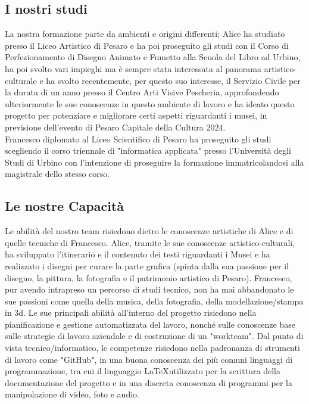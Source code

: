 \documentclass[hidelinks,12pt,a4paper]{article}
\begin{document}
\begin{flushleft}
		\subsection{I nostri studi}
		La nostra formazione parte da ambienti e origini differenti;
		Alice ha studiato presso il Liceo Artistico di Pesaro e ha poi proseguito gli studi con il Corso di Perfezionamento di Disegno Animato e Fumetto alla Scuola del Libro ad Urbino, ha poi svolto vari impieghi ma è sempre stata interessata al panorama artistico-culturale e ha svolto recentemente, per questo suo interesse, il Servizio Civile per la durata di un anno presso il Centro Arti Visive Pescheria, approfondendo ulteriormente le sue conoscenze in questo ambiente di lavoro e ha ideato questo progetto per potenziare e migliorare certi aspetti riguardanti i musei, in previsione dell'evento di Pesaro Capitale della Cultura 2024.\\
		Francesco diplomato al Liceo Scientifico di Pesaro ha proseguito gli studi scegliendo il corso triennale di "informatica applicata" presso l'Università degli Studi di Urbino con l'intenzione di proseguire la formazione immatricolandosi alla magistrale dello stesso corso.  
		
		\subsection{Le nostre Capacità}
		Le abilità del nostro team risiedono dietro le conoscenze artistiche di Alice e di quelle tecniche di Francesco. Alice,
		tramite le sue conoscenze artistico-culturali, ha sviluppato l'itinerario e il contenuto dei testi riguardanti i Musei e ha realizzato i disegni per curare la parte grafica (spinta dalla sua passione per il disegno, la pittura, la fotografia e il patrimonio artistico di Pesaro).
		Francesco, pur avendo intrapreso un percorso di studi tecnico, non ha mai abbandonato le sue passioni come quella della musica, della fotografia, della modellazione/stampa in 3d. Le sue principali abilità all'interno del progetto risiedono nella pianificazione e gestione automatizzata del lavoro, nonché sulle conoscenze base sulle strategie di lavoro aziendale e di costruzione di un "workteam". Dal punto di vista tecnico/informatico, le competenze risiedono nella padronanza di strumenti di lavoro come "GitHub", in una buona conoscenza dei più comuni linguaggi di programmazione, tra cui il linguaggio \LaTeX utilizzato per la scrittura della documentazione del progetto e in una discreta conoscenza di programmi per la manipolazione di video, foto e audio.
		

\end{flushleft}
\end{document}
